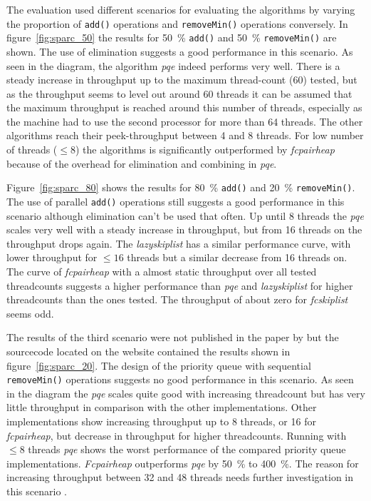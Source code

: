 The evaluation used different scenarios for evaluating the algorithms by varying the proportion of \texttt{add()} operations and \texttt{removeMin()} operations conversely. In figure~\ref{fig:sparc_50} the results for 50~\% \texttt{add()} and 50~\% \texttt{removeMin()} are shown. The use of elimination suggests a good performance in this scenario. As seen in the diagram, the algorithm \textit{pqe} indeed performs very well. There is a steady increase in throughput up to the maximum thread-count ($60$) tested, but as the throughput seems to level out around 60 threads it can be assumed that the maximum throughput is reached around this number of threads, especially as the machine had to use the second processor for more than 64 threads. The other algorithms reach their peek-throughput between 4 and 8 threads. For low number of threads ($\le 8$) the algorithms is significantly outperformed by \textit{fcpairheap} because of the overhead for elimination and combining in \textit{pqe}.

Figure~\ref{fig:sparc_80} shows the results for 80~\% \texttt{add()} and 20~\% \texttt{removeMin()}. The use of parallel \texttt{add()} operations still suggests a good performance in this scenario although elimination can't be used that often. Up until 8 threads the \textit{pqe} scales very well with a steady increase in throughput, but from 16 threads on the throughput drops again. The \textit{lazyskiplist} has a similar performance curve, with lower throughput for $\le 16$ threads but a similar decrease from 16 threads on. The curve of \textit{fcpairheap} with a almost static throughput over all tested threadcounts suggests a higher performance than \textit{pqe} and \textit{lazyskiplist} for higher threadcounts than the ones tested. The throughput of about zero for \textit{fcskiplist} seems odd.

The results of the third scenario were not published in the paper by \citeauthor{calciu_adaptive_2014} but the sourcecode located on the  website contained the results shown in figure~\ref{fig:sparc_20}. The design of the priority queue with sequential \texttt{removeMin()} operations suggests no good performance in this scenario. As seen in the diagram the \textit{pqe} scales quite good with increasing threadcount but has very little throughput in comparison with the other implementations. Other implementations show increasing throughput up to 8 threads, or 16 for \textit{fcpairheap}, but decrease in throughput for higher threadcounts.  Running with $\le 8$ threads \textit{pqe} shows the worst performance of the compared priority queue implementations. \textit{Fcpairheap} outperforms \textit{pqe} by 50~\% to 400~\%. The reason for increasing throughput between 32 and 48 threads needs further investigation in this scenario \cite{calciu_adaptive_2014-1}.

